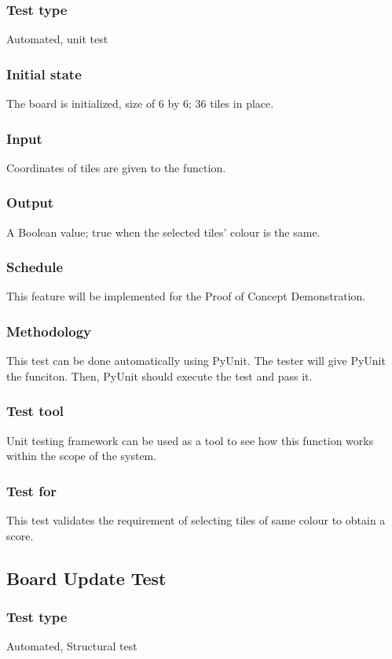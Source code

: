 \documentclass[12pt]{article}
\begin{document}
\subsubsection{Test type}
Automated, unit test
\subsubsection{Initial state}
The board is initialized, size of 6 by 6; 36 tiles in place.
\subsubsection{Input}
Coordinates of tiles are given to the function.
\subsubsection{Output}
A Boolean value; true when the selected tiles' colour is the same.
\subsubsection{Schedule}
This feature will be implemented for the Proof of Concept Demonstration.
\subsubsection{Methodology}
This test can be done automatically using PyUnit. The tester will give PyUnit the funciton. Then, PyUnit should execute the test and pass it.
\subsubsection{Test tool}
Unit testing framework can be used as a tool to see how this function works within the scope of the system. 
\subsubsection{Test for}
This test validates the requirement of selecting tiles of same colour to obtain a score.

\newpage

\subsection{Board Update Test}
\subsubsection{Test type}
Automated, Structural test
\end{document}
